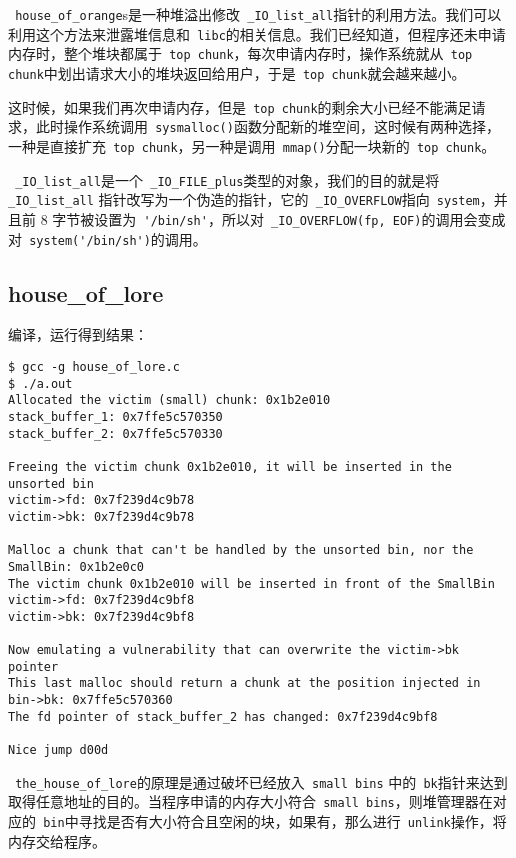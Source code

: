 \verb+ house_of_orange+s是一种堆溢出修改\verb+ _IO_list_all+指针的利用方法。我们可以利用这个方法来泄露堆信息和\verb+ libc+的相关信息。我们已经知道，但程序还未申请内存时，整个堆块都属于\verb+ top chunk+，每次申请内存时，操作系统就从\verb+ top chunk+中划出请求大小的堆块返回给用户，于是\verb+ top chunk+就会越来越小。

这时候，如果我们再次申请内存，但是\verb+ top chunk+的剩余大小已经不能满足请求，此时操作系统调用\verb+ sysmalloc()+函数分配新的堆空间，这时候有两种选择，一种是直接扩充\verb+ top chunk+，另一种是调用\verb+ mmap()+分配一块新的\verb+ top chunk+。

\verb+ _IO_list_all+是一个\verb+ _IO_FILE_plus+类型的对象，我们的目的就是将\verb+ _IO_list_all+ 指针改写为一个伪造的指针，它的\verb+ _IO_OVERFLOW+指向\verb+ system+，并且前 8 字节被设置为\verb+ '/bin/sh'+，所以对\verb+ _IO_OVERFLOW(fp, EOF)+的调用会变成对\verb+ system('/bin/sh')+的调用。

\subsection{house\_of\_lore}

编译，运行得到结果：

\begin{verbatim}
$ gcc -g house_of_lore.c 
$ ./a.out 
Allocated the victim (small) chunk: 0x1b2e010
stack_buffer_1: 0x7ffe5c570350
stack_buffer_2: 0x7ffe5c570330

Freeing the victim chunk 0x1b2e010, it will be inserted in the unsorted bin
victim->fd: 0x7f239d4c9b78
victim->bk: 0x7f239d4c9b78

Malloc a chunk that can't be handled by the unsorted bin, nor the SmallBin: 0x1b2e0c0
The victim chunk 0x1b2e010 will be inserted in front of the SmallBin
victim->fd: 0x7f239d4c9bf8
victim->bk: 0x7f239d4c9bf8

Now emulating a vulnerability that can overwrite the victim->bk pointer
This last malloc should return a chunk at the position injected in bin->bk: 0x7ffe5c570360
The fd pointer of stack_buffer_2 has changed: 0x7f239d4c9bf8

Nice jump d00d
\end{verbatim}

\verb+ the_house_of_lore+的原理是通过破坏已经放入\verb+ small bins+ 中的\verb+ bk+指针来达到取得任意地址的目的。当程序申请的内存大小符合\verb+ small bins+，则堆管理器在对应的\verb+ bin+中寻找是否有大小符合且空闲的块，如果有，那么进行\verb+ unlink+操作，将内存交给程序。

